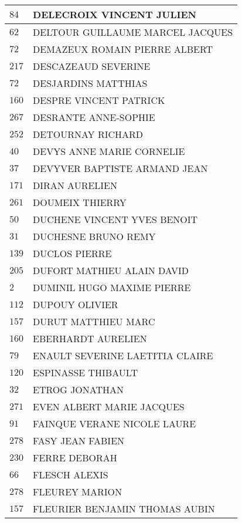 \begin{xltabular}{\linewidth}{|l|X|}
    \hline
    $84$ & DELECROIX VINCENT JULIEN \\
    \hline
    $62$ & DELTOUR GUILLAUME MARCEL JACQUES \\
    \hline
    $72$ & DEMAZEUX ROMAIN PIERRE ALBERT \\
    \hline
    $217$ & DESCAZEAUD SEVERINE \\
    \hline
    $72$ & DESJARDINS MATTHIAS \\
    \hline
    $160$ & DESPRE VINCENT PATRICK \\
    \hline
    $267$ & DESRANTE ANNE-SOPHIE \\
    \hline
    $252$ & DETOURNAY RICHARD \\
    \hline
    $40$ & DEVYS ANNE MARIE CORNELIE \\
    \hline
    $37$ & DEVYVER BAPTISTE ARMAND JEAN \\
    \hline
    $171$ & DIRAN AURELIEN \\
    \hline
    $261$ & DOUMEIX THIERRY \\
    \hline
    $50$ & DUCHENE VINCENT YVES BENOIT \\
    \hline
    $31$ & DUCHESNE BRUNO REMY \\
    \hline
    $139$ & DUCLOS PIERRE \\
    \hline
    $205$ & DUFORT MATHIEU ALAIN DAVID \\
    \hline
    $2$ & DUMINIL HUGO MAXIME PIERRE \\
    \hline
    $112$ & DUPOUY OLIVIER \\
    \hline
    $157$ & DURUT MATTHIEU MARC \\
    \hline
    $160$ & EBERHARDT AURELIEN \\
    \hline
    $79$ & ENAULT SEVERINE LAETITIA CLAIRE \\
    \hline
    $120$ & ESPINASSE THIBAULT \\
    \hline
    $32$ & ETROG JONATHAN \\
    \hline
    $271$ & EVEN ALBERT MARIE JACQUES \\
    \hline
    $91$ & FAINQUE VERANE NICOLE LAURE \\
    \hline
    $278$ & FASY JEAN FABIEN \\
    \hline
    $230$ & FERRE DEBORAH \\
    \hline
    $66$ & FLESCH ALEXIS \\
    \hline
    $278$ & FLEUREY MARION \\
    \hline
    $157$ & FLEURIER BENJAMIN THOMAS AUBIN \\

\end{xltabular}
